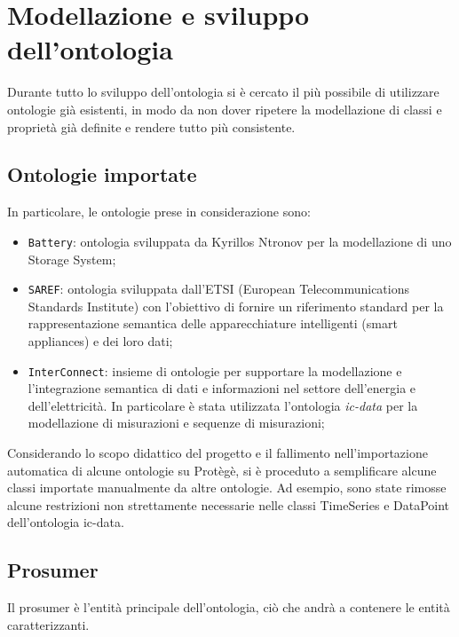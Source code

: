 \chapter{Modellazione e sviluppo dell'ontologia}
Durante tutto lo sviluppo dell'ontologia si è cercato il più possibile di utilizzare ontologie già esistenti, in modo da non dover ripetere la modellazione di classi e proprietà già definite e rendere tutto più consistente.

\section{Ontologie importate}

In particolare, le ontologie prese in considerazione sono:
\begin{itemize}
    \item \texttt{Battery}\cite{battery_kyrillos}: ontologia sviluppata da Kyrillos Ntronov per la modellazione di uno Storage System;
    \item \texttt{SAREF}\cite{saref}: ontologia sviluppata dall'ETSI (European Telecommunications Standards Institute) con l'obiettivo di fornire un riferimento standard per la rappresentazione semantica delle apparecchiature intelligenti (smart appliances) e dei loro dati;
    \item \texttt{InterConnect}\cite{interconnect}: insieme di ontologie per supportare la modellazione e l'integrazione semantica di dati e informazioni nel settore dell'energia e dell'elettricità. In particolare è stata utilizzata l'ontologia \textit{ic-data}\cite{ic-data} per la modellazione di misurazioni e sequenze di misurazioni;
\end{itemize}

Considerando lo scopo didattico del progetto e il fallimento nell'importazione automatica di alcune ontologie su Protègè, si è proceduto a semplificare alcune classi importate manualmente da altre ontologie. Ad esempio, sono state rimosse alcune restrizioni non strettamente necessarie nelle classi TimeSeries e DataPoint dell'ontologia ic-data.

\section{Prosumer}
Il prosumer è l'entità principale dell'ontologia, ciò che andrà a contenere le entità caratterizzanti.

